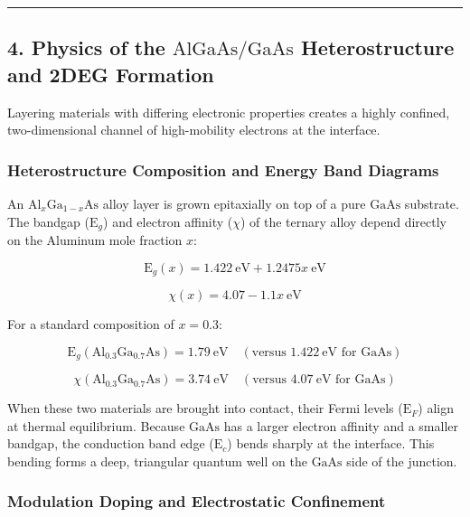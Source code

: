 \documentclass[
]{article}
\begin{document}
\begin{center}\rule{0.5\linewidth}{0.5pt}\end{center}

\subsection{\texorpdfstring{4. Physics of the \(\text{AlGaAs/GaAs}\)
Heterostructure and 2DEG
Formation}{4. Physics of the \textbackslash text\{AlGaAs/GaAs\} Heterostructure and 2DEG Formation}}\label{physics-of-the-textalgaasgaas-heterostructure-and-2deg-formation}

Layering materials with differing electronic properties creates a highly
confined, two-dimensional channel of high-mobility electrons at the
interface.

\subsubsection{Heterostructure Composition and Energy Band
Diagrams}\label{heterostructure-composition-and-energy-band-diagrams}

An \(\text{Al}_x\text{Ga}_{1-x}\text{As}\) alloy layer is grown
epitaxially on top of a pure \(\text{GaAs}\) substrate. The bandgap
(\(\text{E}_g\)) and electron affinity (\(\chi\)) of the ternary alloy
depend directly on the Aluminum mole fraction \(x\):

\[\text{E}_g(x) = 1.422\ \text{eV} + 1.2475x\ \text{eV}\]

\[\chi(x) = 4.07 - 1.1x\ \text{eV}\]

For a standard composition of \(x = 0.3\):

\[\text{E}_g(\text{Al}_{0.3}\text{Ga}_{0.7}\text{As}) = 1.79\ \text{eV} \quad (\text{versus } 1.422\ \text{eV for } \text{GaAs})\]

\[\chi(\text{Al}_{0.3}\text{Ga}_{0.7}\text{As}) = 3.74\ \text{eV} \quad (\text{versus } 4.07\ \text{eV for } \text{GaAs})\]

When these two materials are brought into contact, their Fermi levels
(\(\text{E}_F\)) align at thermal equilibrium. Because \(\text{GaAs}\)
has a larger electron affinity and a smaller bandgap, the conduction
band edge (\(\text{E}_c\)) bends sharply at the interface. This bending
forms a deep, triangular quantum well on the \(\text{GaAs}\) side of the
junction.

\subsubsection{Modulation Doping and Electrostatic
Confinement}\label{modulation-doping-and-electrostatic-confinement}
\end{document}
